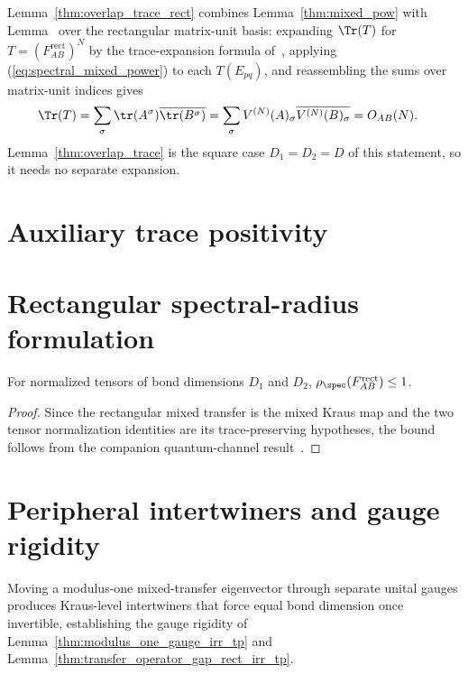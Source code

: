 Lemma~\ref{thm:overlap_trace_rect} combines Lemma~\ref{thm:mixed_pow} with
Lemma~\cite[``Trace expansion over matrix units'']{QICLean2026Blueprint} over the
rectangular matrix-unit basis: expanding $\Tr(T)$ for
$T=(F_{AB}^{\mathrm{rect}})^N$ by the trace-expansion formula
of~\cite[``Trace expansion over matrix units'']{QICLean2026Blueprint}, applying
(\ref{eq:spectral_mixed_power}) to each $T(E_{pq})$, and reassembling the sums
over matrix-unit indices gives
\begin{align}
    \Tr(T)
     & =\sum_\sigma
    \tr(A^\sigma)\overline{\tr(B^\sigma)}
    =\sum_\sigma
    V^{(N)}(A)_\sigma\overline{V^{(N)}(B)_\sigma}
    =O_{AB}(N).
    \notag
\end{align}
Lemma~\ref{thm:overlap_trace} is the square case $D_1=D_2=D$ of this
statement, so it needs no separate expansion.

\section{Auxiliary trace positivity}


\section{Rectangular spectral-radius formulation}

\begin{lemma}\label{thm:spectral_radius_le_one_rect}
    \leanok
    For normalized tensors of bond dimensions $D_1$ and $D_2$,
    $\rho_{\spec}(F_{AB}^{\mathrm{rect}})\leq1$.
\end{lemma}

\begin{proof}\leanok
    Since the rectangular mixed transfer is the mixed Kraus map and the two
    tensor normalization identities are its trace-preserving hypotheses, the
    bound follows from the companion quantum-channel
    result~\cite[``Spectral-radius bound for a trace-preserving mixed Kraus map'']{QICLean2026Blueprint}.
\end{proof}

\section{Peripheral intertwiners and gauge rigidity}
\label{sec:app_spectral_rigidity}

Moving a modulus-one mixed-transfer eigenvector through separate unital
gauges produces Kraus-level intertwiners that force equal bond dimension once
invertible, establishing the gauge rigidity of
Lemma~\ref{thm:modulus_one_gauge_irr_tp} and
Lemma~\ref{thm:transfer_operator_gap_rect_irr_tp}.

